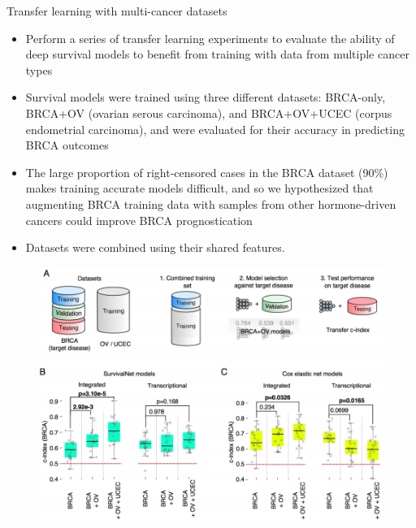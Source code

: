 \documentclass[
]{beamer}
\begin{document}
\begin{frame}{Transfer learning with multi-cancer datasets}
\begin{itemize}
	\item Perform a series of transfer learning experiments
	to evaluate the ability of deep survival models to benefit from training with data from multiple cancer
	types
	\item  Survival models were trained using three different
	datasets: BRCA-only, BRCA+OV (ovarian serous carcinoma), and BRCA+OV+UCEC (corpus endometrial
	carcinoma), and were evaluated for their accuracy in predicting BRCA outcomes
	\item The large proportion of
	right-censored cases in the BRCA dataset (90\%) makes training accurate models difficult, and so we hypothesized
	that augmenting BRCA training data with samples from other hormone-driven cancers could improve BRCA
	prognostication 
	\item Datasets were combined using their shared features. 
	
\end{itemize}
\end{frame}

\begin{frame}
\begin{figure}
	\includegraphics[scale=0.45]{trans1}
\end{figure}
\end{frame}
\end{document}
